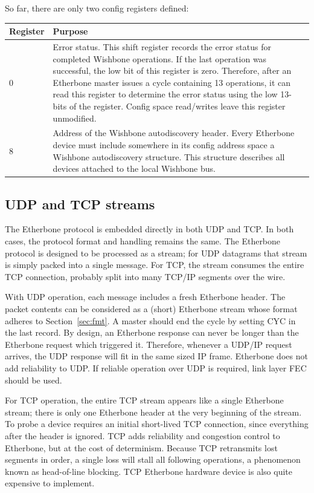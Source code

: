 \documentclass{article}
\begin{document}
So far, there are only two config registers defined:

\begin{tabular}{|l|p{}|}
\hline
Register & Purpose \\
\hline
0 &
Error status.
This shift register records the error status for completed Wishbone
operations.
If the last operation was successful,
the low bit of this register is zero.
Therefore, 
after an Etherbone master issues a cycle containing 13 operations,
it can read this register to determine the error status using the low
13-bits of the register.
Config space read/writes leave this register unmodified.
\\
\hline
8 &
Address of the Wishbone autodiscovery header.
Every Etherbone device must include somewhere in its config address space
a Wishbone autodiscovery structure.
This structure describes all devices attached to the local Wishbone bus.
\\
\hline
\end{tabular}

\subsection{UDP and TCP streams}

The Etherbone protocol is embedded directly in both UDP and TCP.
In both cases, the protocol format and handling remains the same.
The Etherbone protocol is designed to be processed as a stream;
for UDP datagrams that stream is simply packed into a single message.
For TCP, the stream consumes the entire TCP connection,
probably split into many TCP/IP segments over the wire.

With UDP operation,
each message includes a fresh Etherbone header.
The packet contents can be considered as a (short) Etherbone stream
whose format adheres to Section~\ref{sec:fmt}.
A master should end the cycle by setting CYC in the last record.
By design,
an Etherbone response can never be longer than the Etherbone request
which triggered it.
Therefore, whenever a UDP/IP request arrives, 
the UDP response will fit in the same sized IP frame.
Etherbone does not add reliability to UDP.
If reliable operation over UDP is required, 
link layer FEC should be used.

For TCP operation,
the entire TCP stream appears like a single Etherbone stream;
there is only one Etherbone header at the very beginning of the stream.
To probe a device requires an initial short-lived TCP connection,
since everything after the header is ignored.
TCP adds reliability and congestion control to Etherbone,
but at the cost of determinism.
Because TCP retransmits lost segments in order,
a single loss will stall all following operations,
a phenomenon known as head-of-line blocking.
TCP Etherbone hardware device is also quite expensive to implement.
\end{document}
